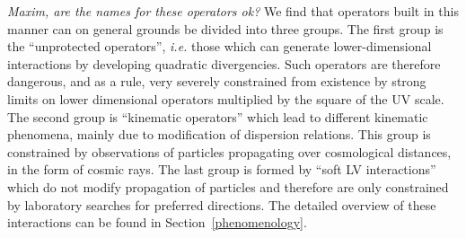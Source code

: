 \documentclass[12pt]{revtex4}
\begin{document}
	{\it Maxim, are the names for these operators ok?}
	We find that operators built in this manner can on general grounds be 
	divided into three groups.
	The first group is the ``unprotected operators'', {\it i.e.} those which can
	generate lower-dimensional interactions by developing quadratic divergencies.
	Such operators are therefore dangerous, and as a rule, very severely constrained
	from existence by strong limits on lower dimensional operators multiplied
	by the square of the UV scale.
	The second group is ``kinematic operators'' which lead to different kinematic
	phenomena, mainly due to modification of dispersion relations.
	This group is constrained by observations of particles propagating over cosmological 
	distances, in the form of cosmic rays.
	The last group is formed by ``soft LV interactions'' which do not modify
	propagation of particles and therefore are only constrained by laboratory
	searches for preferred directions.
	The detailed overview of these interactions can be found 
	in Section~\ref{phenomenology}.


\end{document}
